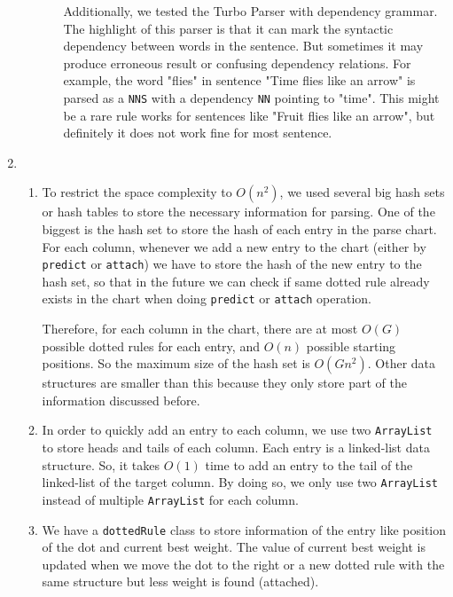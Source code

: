 \documentclass[10pt]{article}
\begin{document}
\begin{enumerate}
\begin{enumerate}
\begin{enumerate}
Additionally, we tested the Turbo Parser with dependency grammar. The highlight of this parser is that it can mark the syntactic dependency between words in the sentence. But sometimes it may produce erroneous result or confusing dependency relations. For example, the word "flies" in sentence "Time flies like an arrow" is parsed as a \texttt{NNS} with a dependency \texttt{NN} pointing to "time". This might be a rare rule works for sentences like "Fruit flies like an arrow", but definitely it does not work fine for most sentence.
 
        \end{enumerate}        
	\end{enumerate}
    
	\item	%
    \begin{enumerate}
		\item
        To restrict the space complexity to $O(n^2)$, we used several big hash sets or hash tables to store the necessary information for parsing. One of the biggest is the hash set to store the hash of each entry in the parse chart. For each column, whenever we add a new entry to the chart (either by \texttt{predict} or \texttt{attach}) we have to store the hash of the new entry to the hash set, so that in the future we can check if same dotted rule already exists in the chart when doing \texttt{predict} or \texttt{attach} operation. 
        
        Therefore, for each column in the chart, there are at most $O(G)$ possible dotted rules for each entry, and $O(n)$ possible starting positions. So the maximum size of the hash set is $O(Gn^2)$. Other data structures are smaller than this because they only store part of the information discussed before.\\
        
        \item  %
        In order to quickly add an entry to each column, we use two \texttt{ArrayList} to store heads and tails of each column. Each entry is a linked-list data structure. So, it takes $O(1)$ time to add an entry to the tail of the linked-list of the target column. By doing so, we only use two \texttt{ArrayList} instead of multiple \texttt{ArrayList} for each column.
        
        \item
        We have a \texttt{dottedRule} class to store information of the entry like position of the dot and current best weight. The value of current best weight is updated when we move the dot to the right or a new dotted rule with the same structure but less weight is found (attached). 
        

\end{enumerate}
\end{enumerate}
\end{document}
